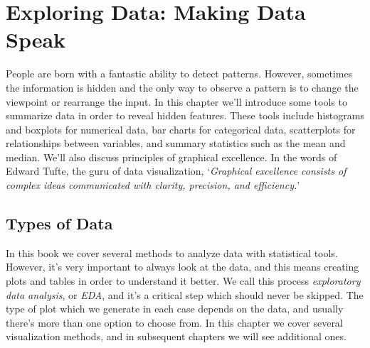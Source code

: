 \chapter{Exploring Data: Making Data Speak}\label{ch:EDA}
\hypertarget{EDA}{%
People are born with a fantastic ability to detect patterns. However, sometimes the
information is hidden and the only way to observe a pattern is to change
the viewpoint or rearrange the input. In this chapter we'll introduce some tools
to summarize data in order to reveal hidden features. These tools include
histograms and boxplots for numerical data, bar charts for categorical data,
scatterplots for relationships between variables, and summary statistics such as
the mean and median. We'll also discuss principles of
graphical excellence. In the words of Edward Tufte, the guru of data visualization,
`\textit{Graphical excellence consists of complex ideas communicated with clarity, precision,
and efficiency.}'
}



\section{Types of Data}
In this book we cover several methods to analyze data with statistical
tools. However, it's very important to always look at the data, and this means
creating plots and tables in order to understand it better. We call this process
\emph{exploratory data analysis}, or \emph{EDA}, and it's a critical step which should
never be skipped. The type of plot which we generate in each case depends on the
data, and usually there's more than one option to choose from. In this chapter
we cover several visualization methods, and in subsequent chapters we will see
additional ones.

